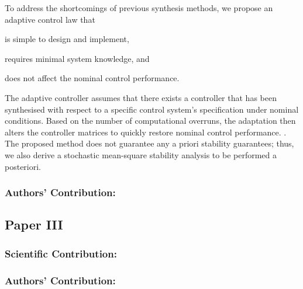 To address the shortcomings of previous synthesis methods, we propose an adaptive control law that
\begin{enumerate*}[label=(\roman*)]
    \item is simple to design and implement,
    \item requires minimal system knowledge, and
    \item does not affect the nominal control performance.
\end{enumerate*}
The adaptive controller assumes that there exists a controller that has been synthesised with respect to a specific control system's specification under nominal conditions.
Based on the number of computational overruns, the adaptation then alters the controller matrices to quickly restore nominal control performance.
.
The proposed method does not guarantee any a priori stability guarantees; thus, we also derive a stochastic mean-square stability analysis to be performed a posteriori.





\subsubsection*{Authors' Contribution:}%
%


\clearpage %

\subsection*{Paper III}%
%
\begin{quote}
\end{quote}

\subsubsection*{Scientific Contribution:}%
%
\subsubsection*{Authors' Contribution:}%
%
    

\clearpage %

